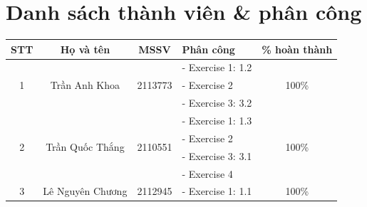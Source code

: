\documentclass[a4paper, 11pt]{article}
\begin{document}
\section*{Danh sách thành viên \& phân công}
\begin{center}
    \begin{table}[h]
        \centering
        \begin{tabular}{|c|c|c|l|c|}
            \hline
            \textbf{STT}       & \textbf{Họ và tên}                & \textbf{MSSV}            & \textbf{Phân công} & \textbf{\% hoàn thành} \\
            \hline
            \multirow{3}{*}{1} & \multirow{3}{*}{Trần Anh Khoa}    & \multirow{3}{*}{2113773} &
            - Exercise 1: 1.2  & \multirow{3}{*}{100\%}                                                                                     \\
                               &                                   &                          & - Exercise 2       &                        \\
                               &                                   &                          & - Exercise 3: 3.2  &                        \\
            \hline
            \multirow{4}{*}{2} & \multirow{4}{*}{Trần Quốc Thắng}  & \multirow{4}{*}{2110551} &
            - Exercise 1: 1.3  & \multirow{4}{*}{100\%}                                                                                     \\
                               &                                   &                          & - Exercise 2       &                        \\
                               &                                   &                          & - Exercise 3: 3.1  &                        \\
                               &                                   &                          & - Exercise 4       &                        \\
            \hline
            \multirow{3}{*}{3} & \multirow{3}{*}{Lê Nguyên Chương} & \multirow{3}{*}{2112945} &
            - Exercise 1: 1.1  & \multirow{3}{*}{100\%}                                                                                     \\

\end{tabular}
\end{table}
\end{center}
\end{document}
